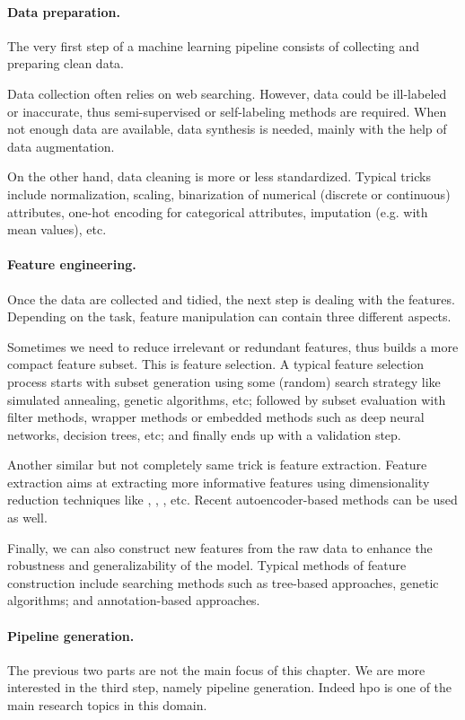 \paragraph{Data preparation.}
The very first step of a machine learning pipeline consists of collecting and preparing clean data.

Data collection often relies on web searching. However, data could be ill-labeled or inaccurate, thus semi-supervised or self-labeling methods are required. When not enough data are available, data synthesis is needed, mainly with the help of data augmentation.

On the other hand, data cleaning is more or less standardized. Typical tricks include normalization, scaling, binarization of numerical (discrete or continuous) attributes, one-hot encoding for categorical attributes, imputation (e.g. with mean values), etc.

\paragraph{Feature engineering.}
Once the data are collected and tidied, the next step is dealing with the features. Depending on the task, feature manipulation can contain three different aspects.

Sometimes we need to reduce irrelevant or redundant features, thus builds a more compact feature subset. This is feature selection. A typical feature selection process starts with subset generation using some (random) search strategy like simulated annealing, genetic algorithms, etc; followed by subset evaluation with filter methods, wrapper methods or embedded methods such as deep neural networks, decision trees, etc; and finally ends up with a validation step.

Another similar but not completely same trick is feature extraction. Feature extraction aims at extracting more informative features using dimensionality reduction techniques like \PCA, \ICA, \LDA, etc. Recent autoencoder-based methods can be used as well.

Finally, we can also construct new features from the raw data to enhance the robustness and generalizability of the model. Typical methods of feature construction include searching methods such as tree-based approaches, genetic algorithms; and annotation-based approaches.

\paragraph{Pipeline generation.} 
The previous two parts are not the main focus of this chapter. We are more interested in the third step, namely pipeline generation. Indeed \gls{hpo} is one of the main research topics in this domain.

